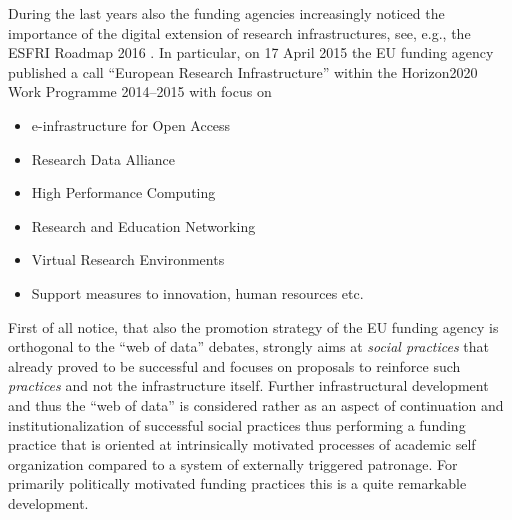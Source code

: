 \documentclass{llncs}
\begin{document}
During the last years also the funding agencies increasingly noticed the
importance of the digital extension of research infrastructures, see, e.g., the
ESFRI Roadmap 2016 \cite{esfri}. In particular, on 17 April 2015 the EU funding
agency published a call ``European Research Infrastructure'' \cite{h2020}
within the Horizon2020 Work Programme 2014--2015 with focus on
\begin{itemize}
\item e-infrastructure for Open Access
\item Research Data Alliance
\item High Performance Computing
\item Research and Education Networking
\item Virtual Research Environments
\item Support measures to innovation, human resources etc. 
\end{itemize}
First of all notice, that also the promotion strategy of the EU funding agency
is orthogonal to the ``web of data'' debates, strongly aims at \emph{social
  practices} that already proved to be successful and focuses on proposals to
reinforce such \emph{practices} and not the infrastructure itself.  Further
infrastructural development and thus the ``web of data'' is considered rather
as an aspect of continuation and institutionalization of successful social
practices thus performing a funding practice that is oriented at intrinsically
motivated processes of academic self organization compared to a system of
externally triggered patronage.  For primarily politically motivated funding
practices this is a quite remarkable development. 
\end{document}
